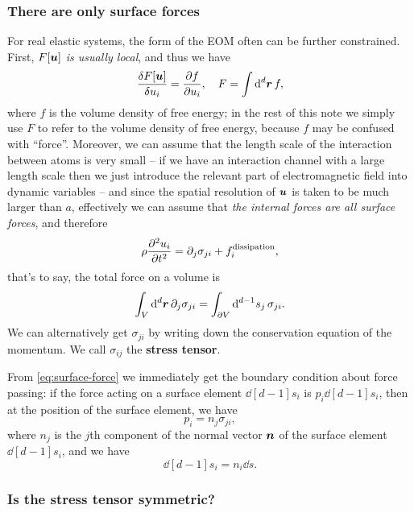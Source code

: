 \documentclass[hyperref, a4paper]{article}
\newcommand*{\concept}[1]{{\textbf{#1}}}
\begin{document}
\subsubsection{There are only surface forces}

For real elastic systems, 
the form of the EOM often can be further constrained.
First, \emph{$F[\vb*{u}]$ is usually local},
and thus we have 
\begin{equation}
    \fdv{F[\vb*{u}]}{u_i} = \pdv{f}{u_i}, \quad F = \int \dd[d]{\vb*{r}} f,
\end{equation}
where $f$ is the volume density of free energy;
in the rest of this note we simply use $F$ to refer to 
the volume density of free energy,
because $f$ may be confused with ``force''.
Moreover, we can assume that the length scale of the interaction 
between atoms 
is very small -- 
if we have an interaction channel with a large length scale 
then we just introduce the relevant part of electromagnetic field 
into dynamic variables -- 
and since the spatial resolution of $\vb*{u}$ is taken to be much larger than $a$,
effectively we can assume that 
\emph{the internal forces are all surface forces},
and therefore 
\begin{equation}
    \rho \pdv[2]{u_i}{t} = \partial_{j} \sigma_{ji} + f_i^{\text{dissipation}},
\end{equation}
that's to say, the total force on a volume is 
\begin{equation}
    \int_V \dd[d]{\vb*{r}} \partial_j \sigma_{ji}
    = \int_{\partial V} \dd[d-1]{s_j} \sigma_{ji}.
    \label{eq:surface-force}
\end{equation}
We can alternatively get $\sigma_{ji}$ by 
writing down the conservation equation of the momentum.
We call $\sigma_{ij}$ the \concept{stress tensor}.

From \eqref{eq:surface-force} we immediately get 
the boundary condition about force passing:
if the force acting on a surface element $\dd[d-1]{s_i}$ is 
$p_{i} \dd[d-1]{s_i}$,
then at the position of the surface element, we have 
\begin{equation}
    p_i = n_j \sigma_{ji},
\end{equation}
where $n_j$ is the $j$th component of the normal vector $\vb*{n}$ of 
the surface element $\dd[d-1]{s_i}$,
and we have 
\begin{equation}
    \dd[d-1]{s_i} = n_i \dd{s}.
\end{equation}

\subsubsection{Is the stress tensor symmetric?}
\end{document}
